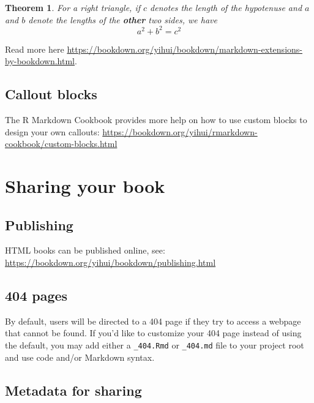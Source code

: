\documentclass[
]{book}
\newtheorem{theorem}{Theorem}[chapter]
\theoremstyle{definition}
\theoremstyle{definition}
\theoremstyle{definition}
\theoremstyle{definition}
\theoremstyle{remark}
\begin{document}
\begin{theorem}
\protect\hypertarget{thm:tri}{}\label{thm:tri}For a right triangle, if \(c\) denotes the \emph{length} of the hypotenuse
and \(a\) and \(b\) denote the lengths of the \textbf{other} two sides, we have
\[a^2 + b^2 = c^2\]
\end{theorem}

Read more here \url{https://bookdown.org/yihui/bookdown/markdown-extensions-by-bookdown.html}.

\hypertarget{callout-blocks}{%
\subsection{Callout blocks}\label{callout-blocks}}

The R Markdown Cookbook provides more help on how to use custom blocks to design your own callouts: \url{https://bookdown.org/yihui/rmarkdown-cookbook/custom-blocks.html}

\hypertarget{sharing-your-book}{%
\section{Sharing your book}\label{sharing-your-book}}

\hypertarget{publishing}{%
\subsection{Publishing}\label{publishing}}

HTML books can be published online, see: \url{https://bookdown.org/yihui/bookdown/publishing.html}

\hypertarget{pages}{%
\subsection{404 pages}\label{pages}}

By default, users will be directed to a 404 page if they try to access a webpage that cannot be found. If you'd like to customize your 404 page instead of using the default, you may add either a \texttt{\_404.Rmd} or \texttt{\_404.md} file to your project root and use code and/or Markdown syntax.

\hypertarget{metadata-for-sharing}{%
\subsection{Metadata for sharing}\label{metadata-for-sharing}}
\end{document}
